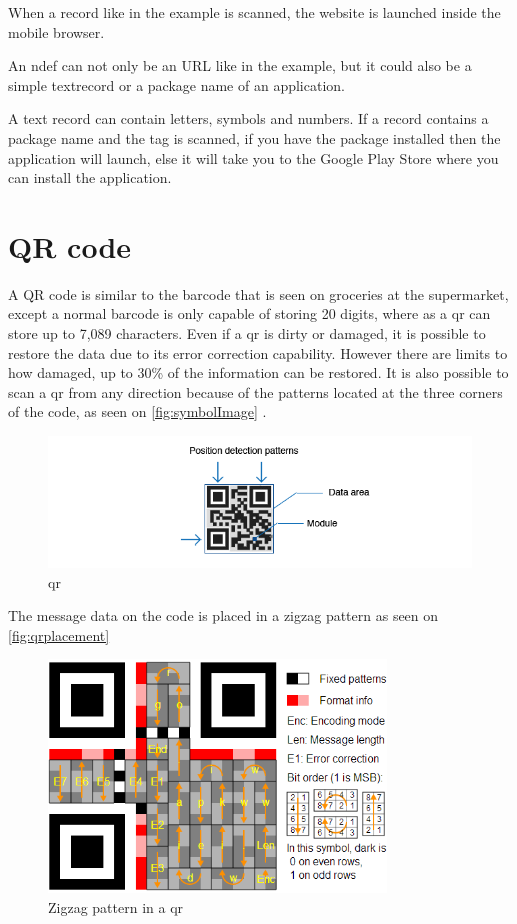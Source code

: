 When a record like in the example is scanned, the website is launched inside the mobile browser. 

An \ac{ndef} can not only be an URL like in the example, but it could also be a simple textrecord or a package name of an application. 

A text record can contain letters, symbols and numbers. If a record contains a package name and the tag is scanned, if you have the package installed then the application will launch, else it will take you to the Google Play Store where you can install the application. 

\section{QR code}

A QR code is similar to the barcode that is seen on groceries at the supermarket, except a normal barcode is only capable of storing 20 digits, where as a \ac{qr} can store up to 7,089 characters. Even if a \ac{qr} is dirty or damaged, it is possible to restore the data due to its error correction capability. However there are limits to how damaged, up to 30\% of the information can be restored. It is also possible to scan a \ac{qr} from any direction  because of the patterns located at the three corners of the code, as seen on \autoref{fig:symbolImage} \citep{qrcode}.

\begin{figure}[H]
\centering
\includegraphics[width=1.5\textwidth]{img/symbolImage.png}
\caption{\ac{qr}\citep{qrcode}}
\label{fig:symbolImage}
\end{figure}

The message data on the code is placed in a zigzag pattern as seen on \autoref{fig:qrplacement} 

\begin{figure}[H]
\centering
\includegraphics[width=0.8\textwidth]{img/qrplacement.png}
\caption{Zigzag pattern in a \ac{qr}\citep{qrcode1}}
\label{fig:qrplacement}
\end{figure}

